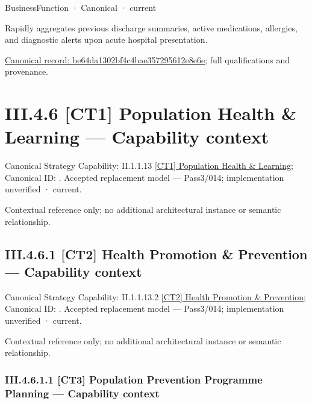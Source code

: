 \label{element:be64da1302bf4c4bae357295612e8e6e}
{\small BusinessFunction · Canonical · current}\par

Rapidly aggregates previous discharge summaries, active medications, allergies, and diagnostic alerts upon acute hospital presentation.


{\footnotesize \href{../../../../../../../../continuum/business/business-function/be64da1302bf4c4bae357295612e8e6e.md}{Canonical record: be64da1302bf4c4bae357295612e8e6e}; full qualifications and provenance.}\par
\section*{III.4.6 [CT1] Population Health \& Learning — Capability context}
\label{navigation:III.4.6}

{\small Canonical Strategy Capability: II.1.1.13 \hyperref[element:171474082c704543b2e57fe37c9797ec]{[CT1] Population Health \& Learning}; Canonical ID: \texttt{}. Accepted replacement model — Pass3/014; implementation unverified · current.}\par
Contextual reference only; no additional architectural instance or semantic relationship.\par
\subsection*{III.4.6.1 [CT2] Health Promotion \& Prevention — Capability context}
\label{navigation:III.4.6.1}

{\small Canonical Strategy Capability: II.1.1.13.2 \hyperref[element:b0100053f6174e2b86e15c545a2fd4d0]{[CT2] Health Promotion \& Prevention}; Canonical ID: \texttt{}. Accepted replacement model — Pass3/014; implementation unverified · current.}\par
Contextual reference only; no additional architectural instance or semantic relationship.\par
\subsubsection*{III.4.6.1.1 [CT3] Population Prevention Programme Planning — Capability context}
\label{navigation:III.4.6.1.1}

